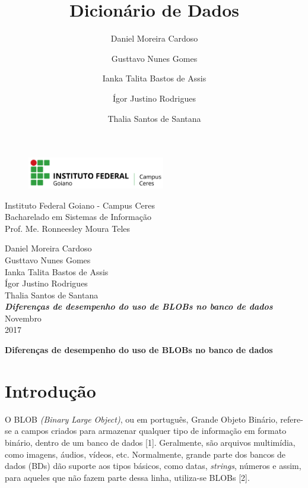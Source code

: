 \documentclass[12pt,a4paper]{article}
\title{Dicionário de Dados}
\author{Daniel Moreira Cardoso \and Gusttavo Nunes Gomes\and Ianka Talita Bastos de Assis\and Ígor Justino Rodrigues \and Thalia Santos de Santana}
\begin{document}
\begin{titlepage}
\begin{center}
\begin{figure}[htb]
	\label{figura:LogoIF}
	\centering
	\includegraphics[width=6cm]{recursos/imagens/logo.png} 
\end{figure}
Instituto Federal Goiano - Campus Ceres\\
Bacharelado em Sistemas de Informação\\
Prof. Me. Ronneesley Moura Teles\\\vspace{1cm}

Daniel Moreira Cardoso \\ 
Gusttavo Nunes Gomes \\ 
Ianka Talita Bastos de Assis \\ 
Ígor Justino Rodrigues \\ 
Thalia Santos de Santana\\
\vspace{6.0cm}
\textit{\textbf{\Large{Diferenças de desempenho do uso de BLOBs no banco de dados}}}\\\vspace{10cm}
Novembro\\
2017\\
\end{center}
\end{titlepage}
\tableofcontents
\newpage
\begin{center}
\textbf{\Large{Diferenças de desempenho do uso de BLOBs no banco de dados}}\\\vspace{0.5cm}
\end{center}
\section{Introdução}
O BLOB \textit{(Binary Large Object)}, ou em português, Grande Objeto Binário, refere-se a campos criados para armazenar qualquer tipo de informação em formato binário, dentro de um banco de dados [1]. Geralmente, são arquivos multimídia, como imagens, áudios, vídeos, etc. Normalmente, grande parte dos bancos de dados (BDs) dão suporte aos tipos básicos, como datas, \textit{strings}, números e assim, para aqueles que não fazem parte dessa linha, utiliza-se BLOBs [2].
\end{document}
